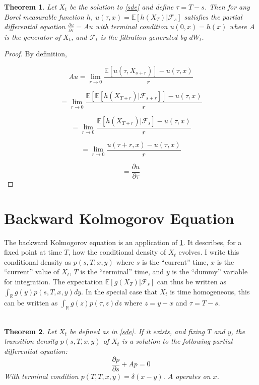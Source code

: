 \documentclass{article}
\newtheorem{theorem}{Theorem}
\theoremstyle{definition}
\begin{document}
\begin{theorem}\label{fk}
	Let \(X_t\) be the solution to \ref{sde} and define \(\tau=T-s\).  Then for any Borel measurable function \(h\),
	\(u(\tau, x)=\mathbb{E}[h(X_T)|\mathcal{F}_s]\) satisfies the partial differential equation
	\(\frac{\partial u}{\partial \tau} = Au \) with terminal condition \(u(0, x)=h(x)\)
	where \(A\) is the generator of \(X_t\),  and \(\mathcal{F}_t\) is the filtration generated by \(dW_t\).
	
\end{theorem}

\begin{proof}
	
	By definition, 
	
	\[Au=\lim_{r \to 0} \frac{\mathbb{E}\left[ u(\tau, X_{s+r}) \right] - u(\tau, x)}{r} \]
	
	\[ =  \lim_{r \to 0} \frac{\mathbb{E}\left[ \mathbb{E}\left[ h(X_{T+r}) | \mathcal{F}_{s+r} \right] \right] - u(\tau, x)}{r} \]
	
	\[ =  \lim_{r \to 0} \frac{ \mathbb{E}\left[ h(X_{T+r}) | \mathcal{F}_{s} \right] - u(\tau, x)}{r} \]
	
	\[ =  \lim_{r \to 0} \frac{ u(\tau+r, x) - u(\tau, x)}{r} \]
	
	\[= \frac{\partial u}{\partial \tau}\]
	

\end{proof}


\section{Backward Kolmogorov Equation}

The backward Kolmogorov equation is an application of \ref{fk}.  It describes, for a fixed point at time \(T\), how the conditional density of \(X_t\) evolves.  I write this conditional density as \(p(s, T, x, y)\) where \(s\) is the ``current'' time, \(x\) is the ``current'' value of \(X_t\), \(T\) is the ``terminal'' time, and \(y\) is the ``dummy'' variable for integration.  The expectation \(\mathbb{E}[g(X_T)|\mathcal{F}_s]\) can thus be written as \(\int_\mathbb{R} g(y) p(s, T, x, y) dy \).  In the special case that \(X_t\) is time homogeneous, this can be written as \(\int_\mathbb{R} g(z) p(\tau, z) dz \) where \(z=y-x\) and \(\tau=T-s\).  
\\
\\
\begin{theorem}\label{bk}
	Let \(X_t\) be defined as in \ref{sde}. If it exists, and fixing \(T\) and \(y\), the transition density \(p(s, T, x, y)\) of \(X_t\) is a solution to the following partial differential equation:
	\[\frac{\partial p}{\partial s} + Ap=0 \]
	With terminal condition \(p(T, T, x, y)=\delta(x-y)\).  \(A\) operates on \(x\).
\end{theorem}
\end{document}
